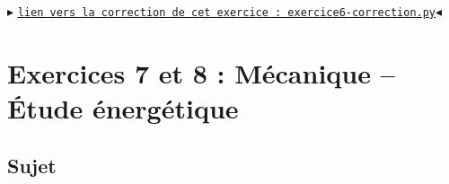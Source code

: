 \documentclass[11pt]{article}
\begin{document}
\bigskip


\begin{center}
$\blacktriangleright$ \href{https://github.com/formationPythonPC-Juin/corrections-formation/blob/master/exercice6-correction.py}{\underline{\texttt{lien vers la correction de cet exercice : exercice6-correction.py}}}$\blacktriangleleft$                                                                                                                                                                    \end{center}
























\newpage


\section{Exercices 7 et 8 : Mécanique -- Étude énergétique}







\bigskip














\subsection{Sujet}
\end{document}

